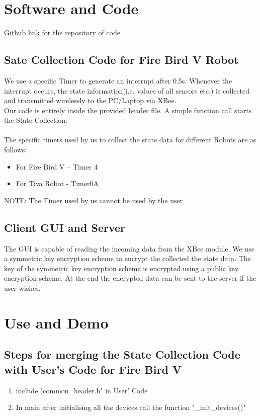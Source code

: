 \documentclass[a4paper,12pt,oneside]{book}
\begin{document}
\newpage
\section{Software and Code}
\href{https://github.com/eYSIP-2016/Robot_State_Collector/tree/master/code}{Github link} for the repository of code
\subsection{Sate Collection Code for Fire Bird V Robot}
We use a specific Timer to generate an interrupt after 0.5s. Whenever the interrupt occurs, the state information(i.e. values of all sensors etc.) is collected and transmitted wirelessly to the PC/Laptop via XBee.\\
    Our code is entirely inside the provided header file. A simple function call starts the State Collection.\\
\\
The specific timers used by us to collect the state data for different Robots are as follows:
\begin{itemize}
\item For Fire Bird V -- Timer 4
\item For Tiva Robot - Timer0A
\end{itemize}

NOTE: The Timer used by us cannot be used by the user. 

\subsection{Client GUI and Server}

The GUI is capable of reading the incoming data from the XBee module. We use a symmetric key encryption scheme to encrypt the collected the state data. The key of the symmetric key encryption scheme is encrypted using a public key encryption scheme. At the end the encrypted data can be sent to the server if the user wishes.

\newpage

\section{Use and Demo}

\subsection{Steps for merging the State Collection Code with User's Code for Fire Bird V}
\begin{enumerate}

\item include "common\_header.h" in User' Code

\item In main after initialising all the devices call the function  "\_init\_devices()"

\end{enumerate}
\end{document}
